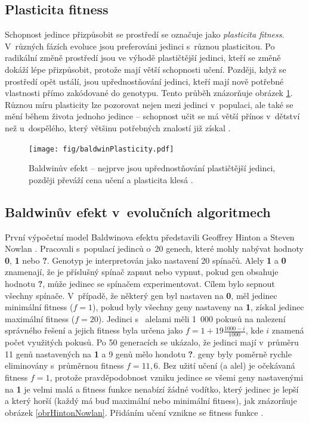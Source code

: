 \subsection{Plasticita fitness}

Schopnost jedince přizpůsobit se prostředí se označuje jako \emph{plasticita fitness}. V~různých fázích evoluce jsou preferováni jedinci s~různou plasticitou. Po radikální změně prostředí jsou ve výhodě plastičtější jedinci, kteří se změně dokáží lépe přizpůsobit, protože mají větší schopnosti učení. Později, když se prostředí opět ustálí, jsou upřednostňování jedinci, kteří mají nově potřebné vlastnosti přímo zakódované do genotypu. Tento průběh znázorňuje obrázek \ref{obrBaldwin}. Různou míru plasticity lze pozorovat nejen mezi jedinci v~populaci, ale také se mění během života jednoho jedince -- schopnost učit se má větší přínos v~dětství než u~dospělého, který většinu potřebných znalostí již získal \cite{EllefsenBalancing}.

\begin{figure}[htb]
    \centering\texttt{[image: fig/baldwinPlasticity.pdf]}
    \caption{Baldwinův efekt -- nejprve jsou upřednostňování plastičtější jedinci, později převáží cena učení a plasticita klesá \cite{EllefsenBalancing}.}
    \label{obrBaldwin}
\end{figure}

\subsection{Baldwinův efekt v~evolučních algoritmech}

První výpočetní model Baldwinova efektu představili Geoffrey Hinton a Steven Nowlan \cite{HintonNowlan}. Pracovali s~populací jedinců o~20 genech, které mohly nabývat hodnoty \textbf{0}, \textbf{1} nebo \textbf{?}. Genotyp je interpretován jako nastavení 20 spínačů. Alely \textbf{1} a \textbf{0} znamenají, že je příslušný spínač zapnut nebo vypnut, pokud gen obsahuje hodnotu \textbf{?}, může jedinec se spínačem experimentovat. Cílem bylo sepnout všechny spínače. V~případě, že některý gen byl nastaven na \textbf{0}, měl jedinec minimální fitness ($f = 1$), pokud byly všechny geny nastaveny na \textbf{1}, získal jedinec maximální fitness ($f = 20$). Jedinci s~ alelami měli 1~000 pokusů na nalezení správného řešení a jejich fitness byla určena jako $f = 1 + 19 \frac{1000 - i}{1000}$, kde $i$ znamená počet využitých pokusů. Po 50 generacích se ukázalo, že jedinci mají v~průměru 11 genů nastavených na \textbf{1} a 9 genů mělo hondotu \textbf{?}.  geny byly poměrně rychle eliminovány s~průměrnou fitness $f = 11,6$. Bez užití učení (a  alel) je očekávaná fitness $f = 1$, protože pravděpodobnost vzniku jedince se všemi geny nastavenými na \textbf{1} je velmi malá a fitness funkce nenabízí žádné vodítko, který jedinec je lepší a který horší (každý má buď maximální nebo minimální fitness), jak znázorňuje obrázek \ref{obrHintonNowlan}. Přidáním učení vznikne se fitness funkce .

